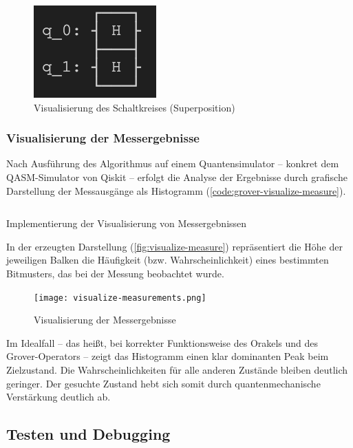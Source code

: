 \begin{figure}
      \includegraphics[width=0.25\linewidth]{circuit_superposition.png}
      \caption{Visualisierung des Schaltkreises (Superposition)}
      \label{fig:grover-visualize-circuit}
\end{figure}

\subsubsection*{Visualisierung der Messergebnisse}

Nach Ausführung des Algorithmus auf einem Quantensimulator – konkret dem QASM-Simulator von Qiskit – erfolgt die Analyse der Ergebnisse durch grafische Darstellung der Messausgänge als Histogramm (\autoref{code:grover-visualize-measure}).  

\begin{listing}[ht!]
  \inputminted{python}{code/grover-visualize-measure.py}
  \caption{Implementierung der Visualisierung von Messergebnissen}
  \label{code:grover-visualize-measure}
\end{listing}

In der erzeugten Darstellung (\autoref{fig:visualize-measure}) repräsentiert die Höhe der jeweiligen Balken die Häufigkeit (bzw. Wahrscheinlichkeit) eines bestimmten Bitmusters, das bei der Messung beobachtet wurde.

\begin{figure}
    \centering
    \texttt{[image: visualize-measurements.png]}
    \caption{Visualisierung der Messergebnisse}
    \label{fig:visualize-measure}
\end{figure}

Im Idealfall – das heißt, bei korrekter Funktionsweise des Orakels und des Grover-Operators – zeigt das Histogramm einen klar dominanten Peak beim Zielzustand.  Die Wahrscheinlichkeiten für alle anderen Zustände bleiben deutlich geringer.  Der gesuchte Zustand hebt sich somit durch quantenmechanische Verstärkung deutlich ab.

\subsection{Testen und Debugging}

